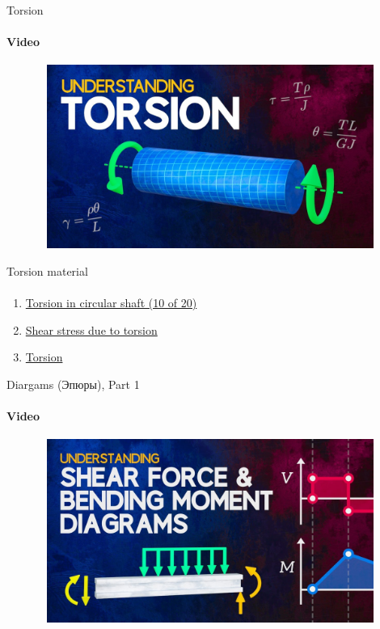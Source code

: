 \documentclass[aspectratio=169]{beamer}
\begin{document}
\begin{frame}[t]{Torsion}
    \framesubtitle{Video}
    \vspace{-0.6cm}
    \begin{figure}[H]
        \href{https://youtu.be/1YTKedLQOa0}{
            \centering\includegraphics[height=6cm,width=1\textwidth,keepaspectratio]{torsion_video.jpg}}
        \label{fig:torsion_video.jpg}
    \end{figure}
\end{frame}

\begin{frame}[t]{Torsion material}
    \framesubtitle{}
    \begin{enumerate}
        \item \href{https://www.youtube.com/watch?v=DA75T6T5erI&list=PLZOZfX_TaWAEg1XjZ1fkUxT0XMB_Nq7hV&index=10&pp=iAQB}{Torsion in circular shaft (10 of 20)}
        \item \href{https://www.youtube.com/watch?v=HTW0PxHw_00&list=PLRqDfxcafc21wlI3E56IkDmRJ-33apMjv&index=28&pp=iAQB}{Shear stress due to torsion}
        \item \href{https://www.youtube.com/watch?v=OIYJVE7mT_4&list=PLOBajja3EcWJx9MVpbBvLthzmZbq4Kwlm&index=57&pp=iAQB}{Torsion}
    \end{enumerate}
    \end{frame}

\begin{frame}[t]{Diargams (Эпюры), Part 1}
    \framesubtitle{Video}
    \vspace{-0.6cm}
    \begin{figure}[H]
        \href{https://youtu.be/C-FEVzI8oe8}{
            \centering\includegraphics[height=6cm,width=1\textwidth,keepaspectratio]{diagrams1_video.jpg}}
        \label{fig:diagrams1_video.jpg}
    \end{figure}
\end{frame}
\end{document}
